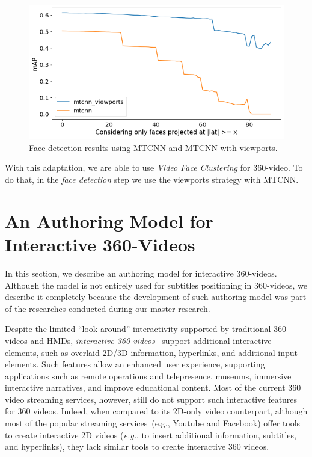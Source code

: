 \begin{figure}[!ht]
    \centering
    \includegraphics[width=0.8\linewidth]{img/video360/results_360_detection.png}
    \caption{Face detection results using MTCNN and MTCNN with viewports.}
    \label{fig:results_360_detection}
\end{figure}

With this adaptation, we are able to use \emph{Video Face Clustering} for 360-video. To do that, in the \emph{face detection} step we use the viewports strategy with MTCNN. 


\section{An Authoring Model for Interactive 360-Videos}
\label{sec:authoring_model}

In this section, we describe an authoring model for interactive 360-videos. Although the model is not entirely used for subtitles positioning in 360-videos, we describe it completely because the development of such authoring model was part of the researches conducted during our master research.

Despite the limited ``look around'' interactivity supported by traditional 360
videos and HMDs, \emph{interactive 360
videos}~\cite{chambel2011,berning2013parnorama} support additional interactive
elements, such as overlaid 2D/3D information, hyperlinks, and additional input
elements.
Such features allow an enhanced user experience, supporting applications such
as remote operations and telepresence, museums, immersive interactive
narratives, and improve educational content.
Most of the current 360 video streaming services, however, still do not
support such interactive features for 360 videos.
Indeed, when compared to its 2D-only video counterpart, although most of the
popular streaming services~(e.g., Youtube and Facebook) offer tools to create
interactive 2D videos (\emph{e.g.}, to insert additional information,
subtitles, and hyperlinks), they lack similar tools to create interactive 360
videos.

